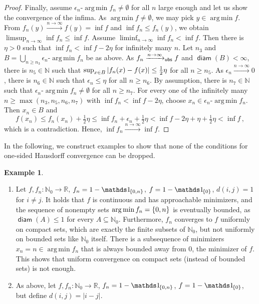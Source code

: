\documentclass{scrartcl}
\renewcommand{\subset}{\subseteq}
\DeclareMathOperator{\diam}{\mathsf{diam}}
\newcommand{\N}{\mathbb{N}}
\newcommand{\R}{\mathbb{R}}
\newcommand{\equationComma}{\, ,}
\newcommand{\eqcm}{\equationComma}
\DeclareMathOperator*{\argmin}{arg\,min}
\theoremstyle{plain}\newtheorem{theorem}{Theorem}[section]
\theoremstyle{definition}
\newtheorem{example}[theorem]{Example}
\theoremstyle{remark}
\begin{document}
\begin{appendix}
\begin{proof}
		Finally, assume $\epsilon_n\text{-}\argmin f_n \neq \emptyset$ for all $n$ large enough and let us show the convergence of the infima.
		As $\argmin f \neq \emptyset$, we may pick $y \in \argmin f$. From $f_n(y) \xrightarrow{n\to\infty} f(y) = \inf f$ and $\inf f_n \leq f_n(y)$, we obtain $\limsup_{n\to\infty} \inf f_n \leq \inf f$.
		Assume $\liminf_{n\to\infty} \inf f_n < \inf f$. Then there is $\eta > 0$ such that $\inf f_n < \inf f - 2\eta$ for infinitely many $n$. Let $n_3$ and $B = \bigcup_{n\geq n_3} \epsilon_n\text{-}\argmin f_n$ be as above. As $f_n \xrightarrow{n\to\infty}_{\mathsf{ubs}} f$ and $\diam(B)<\infty$, there is $n_5\in\N$ such that $\sup_{x\in B}\left| f_n(x) - f(x) \right| \leq \frac12 \eta$ for all $n \geq n_5$. As $\epsilon_n \xrightarrow{n\to\infty} 0$, there is $n_6\in\N$ such that $\epsilon_n \leq \eta$ for all $n\geq n_6$. By assumption, there is $n_7\in\N$ such that $\epsilon_n\text{-}\argmin f_n \neq \emptyset$ for all $n \geq n_7$. For every one of the infinitely many $n \geq \max(n_3, n_5, n_6, n_7)$ with $\inf f_n < \inf f - 2\eta$, choose $x_n \in \epsilon_n\text{-}\argmin f_n$. Then $x_n \in B$ and
		\begin{equation*}
			f(x_n) \leq f_n(x_n) + \tfrac12\eta \leq \inf f_n + \epsilon_n + \tfrac12\eta < \inf f - 2\eta + \eta + \tfrac12\eta < \inf f
			\eqcm
		\end{equation*}
		which is a contradiction. Hence, $\inf f_n \xrightarrow{n\to\infty} \inf f$.
\end{proof}
In the following, we construct examples to show that none of the conditions for one-sided Hausdorff convergence can be dropped.
\begin{example}\label{exa:alt:necessary}
\mbox{ }
\begin{enumerate}[label=(\roman*)]
	\item 
	Let $f,f_n\colon \N_0 \to \R$, $f_n = 1-\indOf{\cb{0,n}}$, $f = 1-\indOf{\cb{0}}$, $d(i,j) = 1$ for $i\neq j$.
	It holds that $f$ is continuous and has approachable minimizers, and the sequence of nonempty sets $\argmin f_n = \cb{0,n}$ is eventually bounded, as $\diam(A)\leq1$ for every $A\subset\N_0$. Furthermore, $f_n$ converges to $f$ uniformly on compact sets, which are exactly the finite subsets of $\N_0$, but not uniformly on bounded sets like $\N_0$ itself.
	There is a subsequence of minimizers $x_n=n\in \argmin f_n$ that is always bounded away from $0$, the minimizer of $f$.
	This shows that uniform convergence on compact sets (instead of bounded sets) is not enough.
	\item
	As above, let $f, f_n\colon \N_0 \to \R$, $f_n = 1-\indOf{\cb{0,n}}$, $f = 1-\indOf{\cb{0}}$, but define $d(i,j) = |i-j|$.

\end{enumerate}
\end{example}
\end{appendix}
\end{document}
